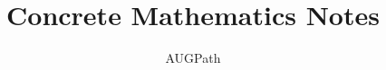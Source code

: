 \documentclass{book}
\begin{document}
\title{Concrete Mathematics Notes}
\author{AUGPath}

\maketitle






\end{document}
